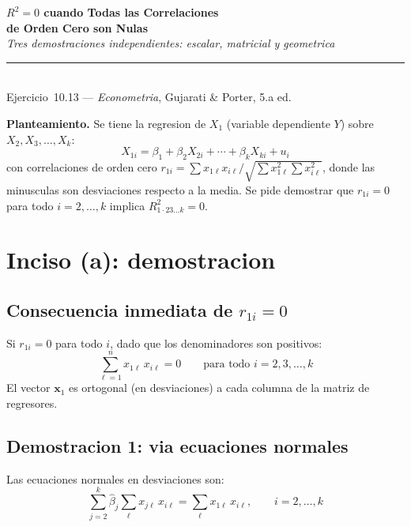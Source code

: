 \documentclass[12pt, letterpaper]{article}
\theoremstyle{remark}\newtheorem{obs}{Observacion}
\begin{document}
\begin{center}
  {\LARGE\bfseries $R^2 = 0$ cuando Todas las Correlaciones}\\[6pt]
  {\LARGE\bfseries de Orden Cero son Nulas}\\[12pt]
  {\large\itshape Tres demostraciones independientes: escalar, matricial y geometrica}\\[14pt]
  \rule{0.55\linewidth}{0.6pt}\\[8pt]
  {\normalsize Ejercicio~10.13 --- \textit{Econometria}, Gujarati \& Porter, 5.a ed.}
\end{center}

\vspace{10pt}

\noindent\textbf{Planteamiento.}\quad
Se tiene la regresion de $X_1$ (variable dependiente $Y$) sobre $X_2, X_3, \ldots, X_k$:
\begin{equation}
  X_{1i} = \beta_1 + \beta_2 X_{2i} + \cdots + \beta_k X_{ki} + u_i
  \label{eq:modelo}
\end{equation}
con correlaciones de orden cero $r_{1i} = \sum x_{1\ell} x_{i\ell}/\sqrt{\sum x_{1\ell}^2 \sum x_{i\ell}^2}$,
donde las minusculas son desviaciones respecto a la media.
Se pide demostrar que $r_{1i} = 0$ para todo $i = 2,\ldots,k$ implica $R^2_{1\cdot 23\ldots k} = 0$.

\section{Inciso (a): demostracion}

\subsection{Consecuencia inmediata de $r_{1i} = 0$}

Si $r_{1i} = 0$ para todo $i$, dado que los denominadores son positivos:
\begin{equation}
  \sum_{\ell=1}^n x_{1\ell}\, x_{i\ell} = 0 \qquad \text{para todo } i = 2, 3, \ldots, k
  \label{eq:ortog}
\end{equation}
El vector $\mathbf{x}_1$ es ortogonal (en desviaciones) a cada columna de la matriz de regresores.

\subsection{Demostracion 1: via ecuaciones normales}

Las ecuaciones normales en desviaciones son:
\begin{equation}
  \sum_{j=2}^{k} \hat\beta_j \sum_\ell x_{j\ell}\, x_{i\ell} = \sum_\ell x_{1\ell}\, x_{i\ell},
  \qquad i = 2, \ldots, k
  \label{eq:normales}
\end{equation}
\end{document}
